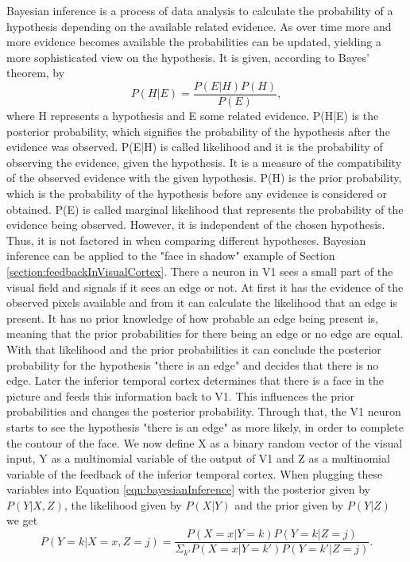 Bayesian inference is a process of data analysis to calculate the probability of a hypothesis depending on the available related evidence. As over time more and more evidence becomes available the probabilities can be updated, yielding a more sophisticated view on the hypothesis. It is given, according to Bayes' theorem, by
\begin{equation}
\label{eqn:bayesianInference}
P(H|E) = \frac{P(E|H)P(H)}{P(E)},
\end{equation}
where H represents a hypothesis and E some related evidence. P(H|E) is the posterior probability, which signifies the probability of the hypothesis after the evidence was observed. P(E|H) is called likelihood and it is the probability of observing the evidence, given the hypothesis. It is a measure of the compatibility of the observed evidence with the given hypothesis. P(H) is the prior probability, which is the probability of the hypothesis before any evidence is considered or obtained. P(E) is called marginal likelihood that represents the probability of the evidence being observed. However, it is independent of the chosen hypothesis. Thus, it is not factored in when comparing different hypotheses.
Bayesian inference can be applied to the "face in shadow" example of Section \ref{section:feedbackInVisualCortex}. There a neuron in V1 sees a small part of the visual field and signals if it sees an edge or not. At first it has the evidence of the observed pixels available and from it can calculate the likelihood that an edge is present. It has no prior knowledge of how probable an edge being present is, meaning that the prior probabilities for there being an edge or no edge are equal. With that likelihood and the prior probabilities it can conclude the posterior probability for the hypothesis "there is an edge" and decides that there is no edge.
Later the inferior temporal cortex determines that there is a face in the picture and feeds this information back to V1. This influences the prior probabilities and changes the posterior probability. Through that, the V1 neuron starts to see the hypothesis  "there is an edge" as more likely, in order to complete the contour of the face. 
We now define X as a binary random vector of the visual input, Y as a multinomial variable of the output of V1 and Z as a multinomial variable of the feedback of the inferior temporal cortex.
When plugging these variables into Equation \ref{eqn:bayesianInference} with the posterior given by $P(Y|X,Z)$, the likelihood given by $P(X|Y)$ and the prior given by $P(Y|Z)$ we get
\begin{equation}
\label{eqn:pYvorausgesetztXUndZ}
P(Y = k|X = x, Z = j) = \frac{P(X=x|Y=k)P(Y = k|Z = j)}{\Sigma_{k'}P(X=x|Y=k')P(Y=k'|Z=j)}.
\end{equation}

